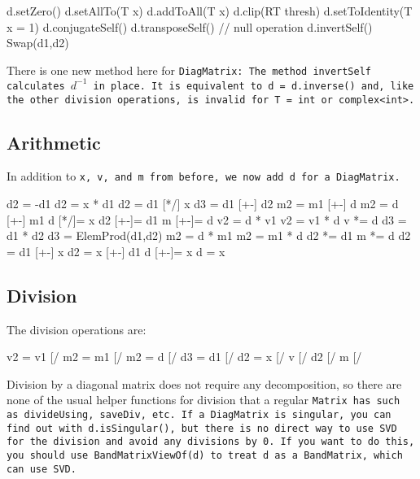 \begin{tmvcode}
d.setZero()
d.setAllTo(T x)
d.addToAll(T x)
d.clip(RT thresh)
d.setToIdentity(T x = 1)
d.conjugateSelf()
d.transposeSelf() // null operation
d.invertSelf()
Swap(d1,d2)
\end{tmvcode}
There is one new method here for \tt{DiagMatrix}: The method \tt{invertSelf}  calculates $d^{-1}$ in place.  
It is equivalent to \tt{d = d.inverse()} and, like the other division operations, is invalid for \tt{T = int} or \tt{complex<int>}.
\vspace{12pt}

\subsection{Arithmetic}
\label{DiagMatrix_Arithmetic}

In addition to \tt{x}, \tt{v}, and \tt{m} from before, we now add \tt{d} for a \tt{DiagMatrix}.

\begin{tmvcode}
d2 = -d1
d2 = x * d1
d2 = d1 [*/] x
d3 = d1 [+-] d2
m2 = m1 [+-] d
m2 = d [+-] m1
d [*/]= x
d2 [+-]= d1
m [+-]= d
v2 = d * v1
v2 = v1 * d
v *= d
d3 = d1 * d2
d3 = ElemProd(d1,d2)
m2 = d * m1
m2 = m1 * d
d2 *= d1
m *= d
d2 = d1 [+-] x
d2 = x [+-] d1
d [+-]= x
d = x
\end{tmvcode}

\subsection{Division}
\label{DiagMatrix_Division}

The division operations are:
\begin{tmvcode}
v2 = v1 [/%
m2 = m1 [/%
m2 = d [/%
d3 = d1 [/%
d2 = x [/%
v [/%
d2 [/%
m [/%
\end{tmvcode}
Division by a diagonal matrix does not require any decomposition, so there are none of the usual helper functions for division that a regular \tt{Matrix} has such as \tt{divideUsing}, \tt{saveDiv}, etc.
If a \tt{DiagMatrix} is singular, you can find out with \tt{d.isSingular()},
but there is no direct way to use SVD for the division and avoid any
divisions by 0.  If you want to do this, you should use \tt{BandMatrixViewOf(d)} to 
treat \tt{d} as a \tt{BandMatrix}, which can use SVD.


